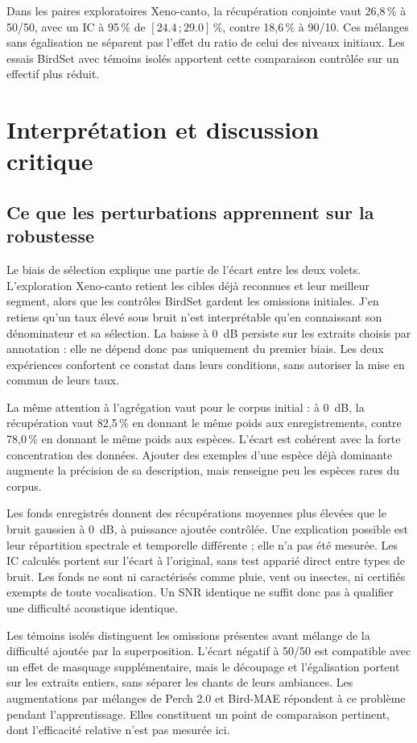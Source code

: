 \documentclass{technology_watch}
\begin{document}
Dans les \OverlapPairs{} paires exploratoires Xeno-canto, la récupération
conjointe vaut 26,8\,\% à 50/50, avec un IC à 95\,\% de
$[\num{24.4}\,;\num{29.0}]$\,\%, contre 18,6\,\% à 90/10. Ces mélanges
sans égalisation ne séparent pas l'effet du ratio de celui des niveaux
initiaux. Les essais BirdSet avec témoins isolés apportent cette comparaison
contrôlée sur un effectif plus réduit.

\section{Interprétation et discussion critique}

\subsection{Ce que les perturbations apprennent sur la robustesse}

Le biais de sélection explique une partie de l'écart entre les deux volets.
L'exploration Xeno-canto retient les cibles déjà reconnues et leur meilleur
segment, alors que les contrôles BirdSet gardent les omissions initiales.
J'en retiens qu'un taux élevé sous bruit n'est interprétable qu'en connaissant
son dénominateur et sa sélection. La baisse à 0~dB persiste sur les extraits
choisis par annotation : elle ne dépend donc pas uniquement du premier biais.
Les deux expériences confortent ce constat dans leurs conditions, sans
autoriser la mise en commun de leurs taux.

La même attention à l'agrégation vaut pour le corpus initial : à 0~dB,
la récupération vaut 82,5\,\% en donnant le même poids aux enregistrements,
contre 78,0\,\% en donnant le même poids aux espèces. L'écart est cohérent
avec la forte concentration des données. Ajouter des exemples d'une espèce
déjà dominante augmente la précision de sa description, mais renseigne peu
les espèces rares du corpus.

Les fonds enregistrés donnent des récupérations moyennes plus élevées que le
bruit gaussien à 0~dB, à puissance ajoutée contrôlée. Une explication possible
est leur répartition spectrale et temporelle différente ; elle n'a pas été
mesurée. Les IC calculés portent sur l'écart à l'original, sans test apparié
direct entre types de bruit. Les fonds ne sont ni caractérisés comme pluie,
vent ou insectes, ni certifiés exempts de toute vocalisation. Un SNR identique
ne suffit donc pas à qualifier une difficulté acoustique identique.

Les témoins isolés distinguent les omissions présentes avant mélange de la
difficulté ajoutée par la superposition. L'écart négatif à 50/50 est compatible
avec un effet de masquage supplémentaire, mais le découpage et l'égalisation
portent sur les extraits entiers, sans séparer les chants de leurs ambiances.
Les augmentations par mélanges de Perch 2.0 et Bird-MAE répondent à ce problème
pendant l'apprentissage\cite{perch2025,birdmae2025}. Elles constituent un point
de comparaison pertinent, dont l'efficacité relative n'est pas mesurée ici.
\end{document}
